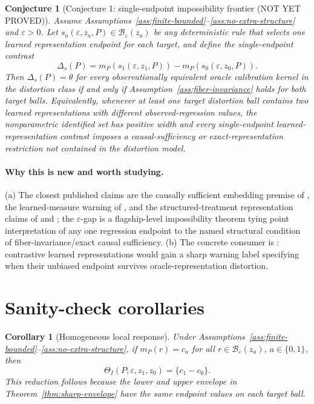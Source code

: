 \documentclass[11pt]{article}
\theoremstyle{definition}
\theoremstyle{plain}
\newtheorem{conjecture}{Conjecture}
\newtheorem{corollary}{Corollary}
\theoremstyle{remark}
\begin{document}
\begin{conjecture}[Conjecture 1: single-endpoint impossibility frontier (NOT YET PROVED)]\label{conj:endpoint-impossibility}
Assume Assumptions~\ref{ass:finite-bounded}--\ref{ass:no-extra-structure} and \(\varepsilon>0\). Let \(s_a(\varepsilon,z_a,P)\in\mathcal B_\varepsilon(z_a)\) be any deterministic rule that selects one learned representation endpoint for each target, and define the single-endpoint contrast
\[
\Delta_s(P)=m_P(s_1(\varepsilon,z_1,P))-m_P(s_0(\varepsilon,z_0,P)).
\]
Then \(\Delta_s(P)=\theta\) for every observationally equivalent oracle calibration kernel in the distortion class if and only if Assumption~\ref{ass:fiber-invariance} holds for both target balls. Equivalently, whenever at least one target distortion ball contains two learned representations with different observed-regression values, the nonparametric identified set has positive width and every single-endpoint learned-representation contrast imposes a causal-sufficiency or exact-representation restriction not contained in the distortion model.
\end{conjecture}

\paragraph{Why this is new and worth studying.}
(a) The closest published claims are the causally sufficient embedding premise of \citet{VeitchSridharBlei2020}, the learned-measure warning of \citet{EgamiFongGrimmerRobertsStewart2022}, and the structured-treatment representation claims of \citet{KaddourZhuLiuKusnerSilva2021} and \citet{CorcollAndreuVlontzosORiordanGilliganLee2026}; the \(\varepsilon\)-gap is a flagship-level impossibility theorem tying point interpretation of any one regression endpoint to the named structural condition of fiber-invariance/exact causal sufficiency. (b) The concrete consumer is \citet{CorcollAndreuVlontzosORiordanGilliganLee2026}: contrastive learned representations would gain a sharp warning label specifying when their unbiased endpoint survives oracle-representation distortion.

\section{Sanity-check corollaries}
\begin{corollary}[Homogeneous local response]\label{cor:homogeneous}
Under Assumptions~\ref{ass:finite-bounded}--\ref{ass:no-extra-structure}, if \(m_P(r)=c_a\) for all \(r\in\mathcal B_\varepsilon(z_a)\), \(a\in\{0,1\}\), then
\[
\Theta_I(P;\varepsilon,z_1,z_0)=\{c_1-c_0\}.
\]
This reduction follows because the lower and upper envelope in Theorem~\ref{thm:sharp-envelope} have the same endpoint values on each target ball.
\end{corollary}
\end{document}
